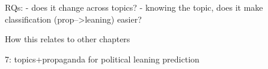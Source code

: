 


RQs:
- does it change across topics?
- knowing the topic, does it make classification (prop-->leaning) easier?

How this relates to other chapters

7: topics+propaganda for political leaning prediction